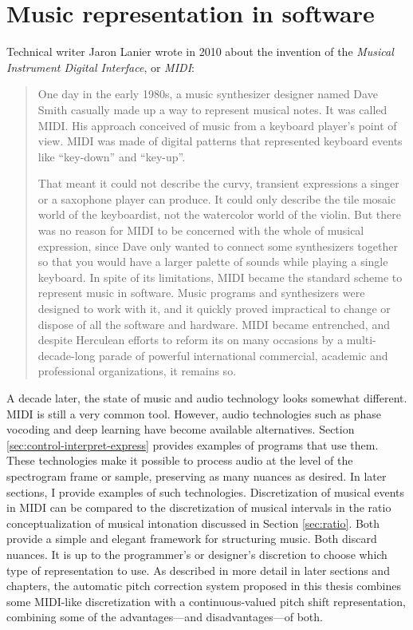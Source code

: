 \section{Music representation in software}
Technical writer Jaron Lanier wrote in 2010 about the invention of the \textit{Musical Instrument Digital Interface}, or \textit{MIDI}: \begin{quote}One day in the early 1980s, a music synthesizer designer named Dave Smith casually made up a way to represent musical notes. It was called MIDI. His approach conceived of music from a keyboard player's point of view. MIDI was made of digital patterns that represented keyboard events like ``key-down'' and ``key-up''. 

That meant it could not describe the curvy, transient expressions a singer or a saxophone player can produce. It could only describe the tile mosaic world of the keyboardist, not the watercolor world of the violin. But there was no reason for MIDI to be concerned with the whole of musical expression, since Dave only wanted to connect some synthesizers together so that you would have a larger palette of sounds while playing a single keyboard. In spite of its limitations, MIDI became the standard scheme to represent music in software. Music programs and synthesizers were designed to work with it, and it quickly proved impractical to change or dispose of all the software and hardware. MIDI became entrenched, and despite Herculean efforts to reform its on many occasions by a multi-decade-long parade of powerful international commercial, academic and professional organizations, it remains so. \cite[p.~7]{lanier2010you}\end{quote}

A decade later, the state of music and audio technology looks somewhat different. MIDI is still a very common tool. However, audio technologies such as phase vocoding and deep learning have become available alternatives. Section \ref{sec:control-interpret-express} provides examples of programs that use them. These technologies make it possible to process audio at the level of the spectrogram frame or sample, preserving as many nuances as desired. In later sections, I provide examples of such technologies. Discretization of musical events in MIDI can be compared to the discretization of musical intervals in the ratio conceptualization of musical intonation discussed in Section \ref{sec:ratio}. Both provide a simple and elegant framework for structuring music. Both discard nuances. It is up to the programmer's or designer's discretion to choose which type of representation to use. As described in more detail in later sections and chapters, the automatic pitch correction system proposed in this thesis combines some MIDI-like discretization with a continuous-valued pitch shift representation, combining some of the advantages---and disadvantages---of both.

